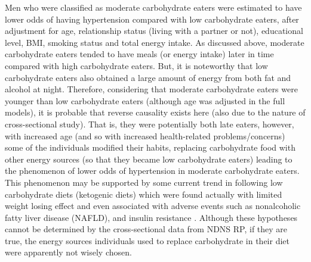 Men who were classified as moderate carbohydrate eaters were estimated to have lower odds of having hypertension compared with low carbohydrate eaters, after adjustment for age, relationship status (living with a partner or not), educational level, BMI, smoking status and total energy intake. As discussed above, moderate carbohydrate eaters tended to have meals (or energy intake) later in time compared with high carbohydrate eaters. But, it is noteworthy that low carbohydrate eaters also obtained a large amount of energy from both fat and alcohol at night. Therefore, considering that moderate carbohydrate eaters were younger than low carbohydrate eaters (although age was adjusted in the full models), it is probable that reverse causality exists here (also due to the nature of cross-sectional study). That is, they were potentially both late eaters, however, with increased age (and so with increased health-related problems/concerns) some of the individuals modified their habits,  replacing carbohydrate food with other energy sources (so that they became low carbohydrate eaters) leading to the phenomenon of lower odds of hypertension in moderate carbohydrate eaters. This phenomenon may be supported by some current trend in following low carbohydrate diets (ketogenic diets) which were found actually with limited weight losing effect and even associated with adverse events such as nonalcoholic fatty liver disease (NAFLD), and insulin resistance \parencite{kosinski2017effects}. Although these hypotheses cannot be determined by the cross-sectional data from NDNS RP, if they are true, the energy sources individuals used to replace carbohydrate in their diet were apparently not wisely chosen. 

